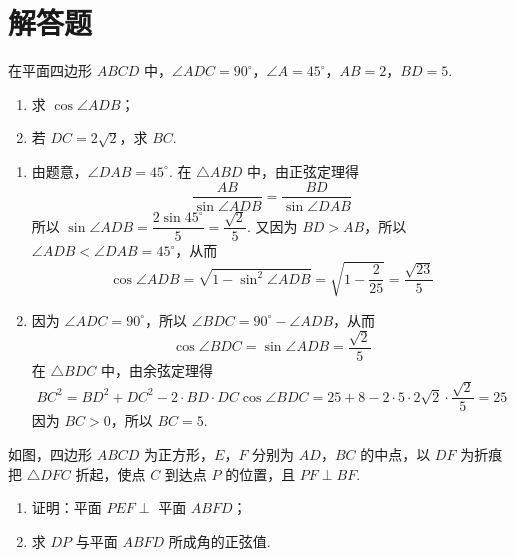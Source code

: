 \section{解答题}

\begin{problem}
在平面四边形 \(ABCD\) 中，\(\angle ADC=90^\circ\)，\(\angle A=45^\circ\)，\(AB=2\)，\(BD=5\).

\begin{enumerate}
\item 求 \(\cos\angle ADB\)；
\item 若 \(DC=2\sqrt2\)，求 \(BC\).
\end{enumerate}
\end{problem}

\begin{solution}
\begin{enumerate}
\item 由题意，\(\angle DAB=45^\circ\). 在 \(\triangle ABD\) 中，由正弦定理得
\[
\frac{AB}{\sin\angle ADB}=\frac{BD}{\sin\angle DAB}
\]
所以 \(\sin\angle ADB=\dfrac{2\sin45^\circ}{5}=\dfrac{\sqrt2}{5}\). 又因为 \(BD>AB\)，所以 \(\angle ADB<\angle DAB=45^\circ\)，从而
\[
\cos\angle ADB=\sqrt{1-\sin^2\angle ADB}=\sqrt{1-\frac{2}{25}}=\frac{\sqrt{23}}{5}
\]

\item 因为 \(\angle ADC=90^\circ\)，所以 \(\angle BDC=90^\circ-\angle ADB\)，从而
\[
\cos\angle BDC=\sin\angle ADB=\frac{\sqrt2}{5}
\]
在 \(\triangle BDC\) 中，由余弦定理得
\[
BC^2=BD^2+DC^2-2\cdot BD\cdot DC\cos\angle BDC
=25+8-2\cdot5\cdot2\sqrt2\cdot\frac{\sqrt2}{5}=25
\]
因为 \(BC>0\)，所以 \(BC=5\).
\end{enumerate}
\end{solution}

\begin{problem}
如图，四边形 \(ABCD\) 为正方形，\(E\)，\(F\) 分别为 \(AD\)，\(BC\) 的中点，以 \(DF\) 为折痕把 \(\triangle DFC\) 折起，使点 \(C\) 到达点 \(P\) 的位置，且 \(PF\perp BF\).

\begin{enumerate}
\item 证明：平面 \(PEF\perp\) 平面 \(ABFD\)；
\item 求 \(DP\) 与平面 \(ABFD\) 所成角的正弦值.
\end{enumerate}

\end{problem}

